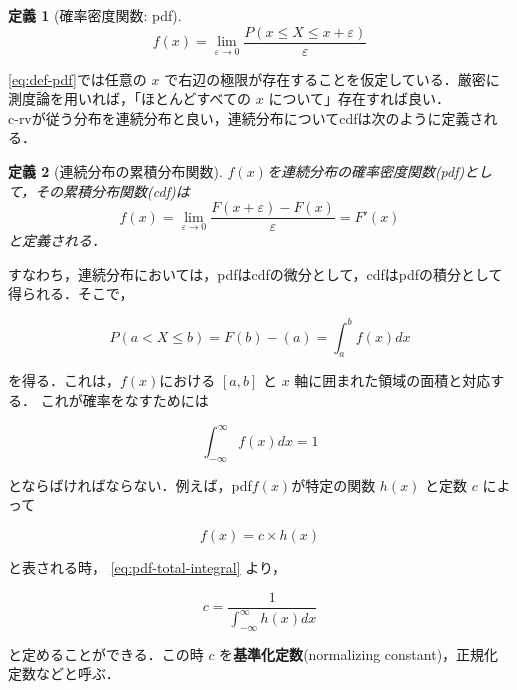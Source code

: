 \documentclass[12pt,a4j,draft]{jarticle}
\numberwithin{equation}{section}
\theoremstyle{break}
\newtheorem{definition}{定義}[section]
\begin{document}
\begin{definition}[確率密度関数: pdf]
\begin{equation}
    f(x) = \lim_{\varepsilon \rightarrow 0} \frac{P(x \leq X \leq x + \varepsilon)}{\varepsilon}
    \label{eq:def-pdf}
\end{equation}
\end{definition}

\eqref{eq:def-pdf}では任意の $x$ で右辺の極限が存在することを仮定している．厳密に測度論を用いれば，「ほとんどすべての $x$ について」存在すれば良い．\\

c-rvが従う分布を連続分布と良い，連続分布についてcdfは次のように定義される．

\begin{definition}[連続分布の累積分布関数]
$f(x)$を連続分布の確率密度関数(pdf)として，その累積分布関数(cdf)は
    \begin{equation}
        f(x) = \lim_{\varepsilon \rightarrow 0} \frac{F(x+\varepsilon) - F(x)}{\varepsilon} = F'(x)
    \end{equation}
と定義される．
\end{definition}

すなわち，連続分布においては，pdfはcdfの微分として，cdfはpdfの積分として得られる．そこで，

\begin{equation}
    P(a < X \leq b) = F(b) - (a) = \int_a^b f(x) dx
\end{equation}

を得る．これは，$f(x)$における $[a,b]$ と $x$ 軸に囲まれた領域の面積と対応する．
これが確率をなすためには

\begin{equation}
    \int_{-\infty}^{\infty} f(x) dx = 1
    \label{eq:pdf-total-integral}
\end{equation}

とならばければならない．例えば，pdf$f(x)$が特定の関数 $h(x)$ と定数 $c$ によって

\begin{equation}
    f(x) = c \times h(x)
\end{equation}

と表される時， \eqref{eq:pdf-total-integral} より， 

\begin{equation}
    c = \frac{1}{\displaystyle \int_{-\infty}^{\infty} h(x) dx}
\end{equation}

と定めることができる．この時 $c$ を\textbf{基準化定数}(normalizing constant)，正規化定数などと呼ぶ．
%
\end{document}
